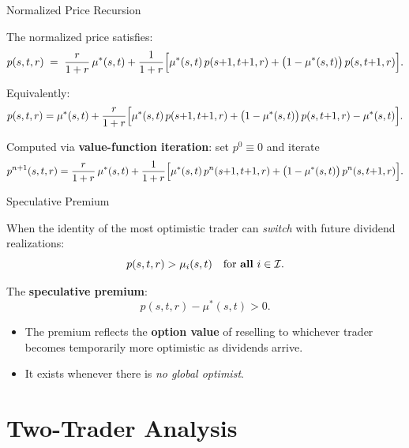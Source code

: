 \documentclass[11pt,aspectratio=169]{beamer}
\begin{document}
\begin{frame}{Normalized Price Recursion}

The normalized price satisfies:
\[
  p(s,t,r) \;=\; \frac{r}{1+r}\,\mu^*(s,t)
  + \frac{1}{1+r}\Bigl[
    \mu^*(s,t)\,p(s{+}1,t{+}1,r)
    + \bigl(1-\mu^*(s,t)\bigr)\,p(s,t{+}1,r)
  \Bigr].
\]

\medskip

Equivalently:
\[
  p(s,t,r) = \mu^*(s,t) + \frac{r}{1+r}\Bigl[
    \mu^*(s,t)\,p(s{+}1,t{+}1,r)
    + \bigl(1-\mu^*(s,t)\bigr)\,p(s,t{+}1,r) - \mu^*(s,t)
  \Bigr].
\]

\medskip

Computed via \textbf{value-function iteration}: set $p^0 \equiv 0$
and iterate
\[
  p^{n+1}(s,t,r) = \frac{r}{1+r}\,\mu^*(s,t)
  + \frac{1}{1+r}\Bigl[
    \mu^*(s,t)\,p^n(s{+}1,t{+}1,r)
    + \bigl(1-\mu^*(s,t)\bigr)\,p^n(s,t{+}1,r)
  \Bigr].
\]

\end{frame}

\begin{frame}{Speculative Premium}

When the identity of the most optimistic trader can \emph{switch}
with future dividend realizations:
\[
  p(s,t,r) > \mu_i(s,t) \quad \text{for \textbf{all} } i\in\mathcal{I}.
\]

\bigskip

The \textbf{speculative premium}:
\[
  p(s,t,r) - \mu^*(s,t) > 0.
\]

\bigskip

\begin{itemize}
\item The premium reflects the \textbf{option value} of reselling to
      whichever trader becomes temporarily more optimistic as
      dividends arrive.
\item It exists whenever there is \emph{no global optimist}.
\end{itemize}

\end{frame}


\section{Two-Trader Analysis}
\end{document}
